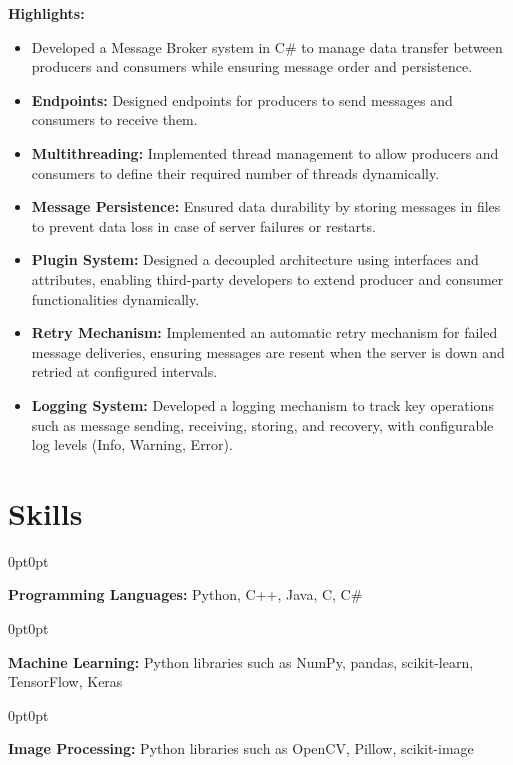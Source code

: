 \documentclass[10pt, a4paper]{article}
\newenvironment{onecolentry}{
    \begin{adjustwidth}{0pt}{0pt}
}{\end{adjustwidth}}
\begin{document}
\textbf{Highlights:}
\begin{itemize}
    \item Developed a Message Broker system in C\# to manage data transfer between producers and consumers while ensuring message order and persistence.
    \item \textbf{Endpoints:} Designed endpoints for producers to send messages and consumers to receive them.
    \item \textbf{Multithreading:} Implemented thread management to allow producers and consumers to define their required number of threads dynamically.
    \item \textbf{Message Persistence:} Ensured data durability by storing messages in files to prevent data loss in case of server failures or restarts.
    \item \textbf{Plugin System:} Designed a decoupled architecture using interfaces and attributes, enabling third-party developers to extend producer and consumer functionalities dynamically.
    \item \textbf{Retry Mechanism:} Implemented an automatic retry mechanism for failed message deliveries, ensuring messages are resent when the server is down and retried at configured intervals.
    \item \textbf{Logging System:} Developed a logging mechanism to track key operations such as message sending, receiving, storing, and recovery, with configurable log levels (Info, Warning, Error).

\end{itemize}

\section{Skills}

\begin{onecolentry}
    \textbf{Programming Languages:} Python, C++, Java, C, C\#
\end{onecolentry}


\vspace{0.1 cm}

\begin{onecolentry}
    \textbf{Machine Learning:} Python libraries such as NumPy, pandas, scikit-learn, TensorFlow, Keras
\end{onecolentry}

\vspace{0.1 cm}

\begin{onecolentry}
    \textbf{Image Processing:} Python libraries such as OpenCV, Pillow, scikit-image
\end{onecolentry}
\end{document}
